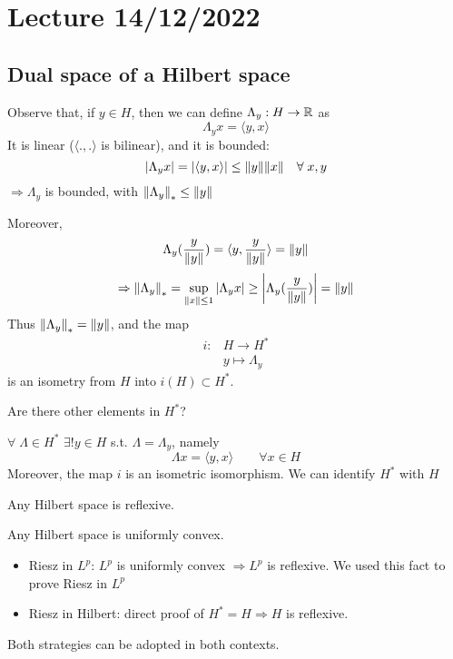 \section{Lecture 14/12/2022}

\subsection*{Dual space of a Hilbert space}
Observe that, if \(y \in H\), then we can define \(\Lambda_y : H \to \mathbb{R}\) as
\[
    \Lambda_y x = \langle y, x\rangle  
\]
It is linear (\(\langle .,.\rangle   \) is bilinear), and it is bounded: 
\[
    \abs{\Lambda_y x}= \abs{\langle y, x\rangle  } \leq \norm{y} \norm{x} \quad \forall\; x, y
\]
\(\Rightarrow \Lambda_y\) is bounded, with \(\norm{\Lambda_y}_* \leq \norm{y}\)

Moreover, 
\[
    \Lambda_y (\frac{y}{\norm{y}}) = \langle y, \frac{y}{\norm{y}}\rangle   = \norm{y}
\]
\[
    \Rightarrow \norm{\Lambda_y}_* = \sup_{\norm{x} \leq 1} \abs{\Lambda_y x} \geq \abs{\Lambda_y (\frac{y}{\norm{y}})} = \norm{y}
\]
Thus \( \norm{\Lambda_y}_* = \norm{y}\), and the map 
\[
    \begin{array}{rl}
        i: & H \to H^* \\
        & y \mapsto \Lambda_y    
    \end{array}
\]
is an isometry from \(H\) into \(i(H) \subset {H^*}\).

Are there other elements in \(H^*\)?

\begin{theorem}
    \(\forall \; \Lambda \in H^* \) \(\exists! y \in H\) s.t. \(\Lambda = \Lambda_y\), namely
    \[
        \Lambda x = \langle y, x\rangle   \qquad \forall x \in H
    \]
    Moreover, the map \(i\) is an isometric isomorphism. We can identify \(H^*\) with \(H\)
\end{theorem}

\begin{corollary}
    Any Hilbert space is reflexive. 
\end{corollary}
\begin{remark}
    Any Hilbert space is uniformly convex.
\end{remark}

\begin{itemize}
    \item Riesz in \(L^p\): \(L^p \) is uniformly convex \(\Rightarrow L^p\) is reflexive. We used this fact to prove Riesz in \(L^p\)
    \item Riesz in Hilbert: direct proof of \(H^* = H \Rightarrow H\) is reflexive.
\end{itemize}
Both strategies can be adopted in both contexts.

